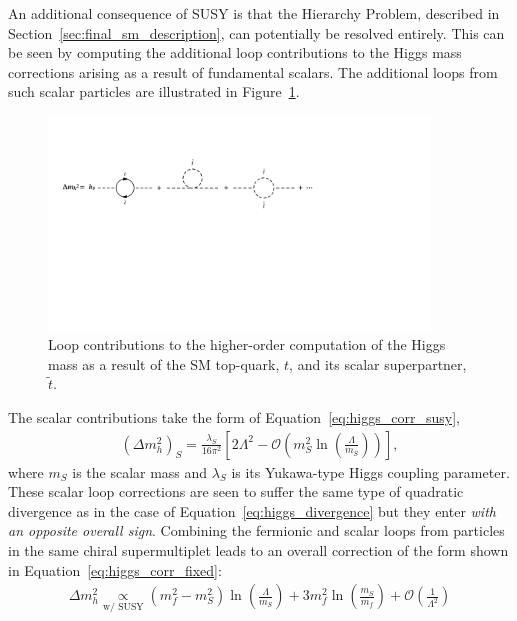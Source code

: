 An additional consequence of SUSY is that the Hierarchy Problem, described in Section~\ref{sec:final_sm_description},
can potentially be resolved entirely.
This can be seen by computing the additional loop contributions to the Higgs mass corrections arising as a result of fundamental scalars.
The additional loops from such scalar particles are illustrated in Figure~\ref{fig:higgs_mass_correction_stop}.
\begin{figure}[!htb]
    \begin{center}
        \includegraphics[width=0.9\textwidth]{figures/higgs_corr/higgs_mass_corrections_stopPDF}
        \caption{
            Loop contributions to the higher-order computation of the Higgs mass as a result of the SM top-quark, $t$,
            and its scalar superpartner, $\tilde{t}$.
        }
        \label{fig:higgs_mass_correction_stop}
    \end{center}
\end{figure}
The scalar contributions take the form of Equation~\ref{eq:higgs_corr_susy},
\begin{align}
    \left( \Delta m_h^2 \right)_{S} = \frac{\lambda_S}{16 \pi^2} \left[ 2 \Lambda^2 - \mathcal{O} \left( m_S^2 \ln \left( \frac{\Lambda}{m_S} \right) \right) \right],
    \label{eq:higgs_corr_susy}
\end{align}
where $m_S$ is the scalar mass and $\lambda_S$ is its Yukawa-type Higgs coupling parameter.
These scalar loop corrections are seen to suffer the same type of quadratic divergence
as in the case of Equation~\ref{eq:higgs_divergence} but they enter \textit{with an opposite overall sign}.
Combining the fermionic and scalar loops from particles in the same chiral supermultiplet leads
to an overall correction of the form shown in Equation~\ref{eq:higgs_corr_fixed}:
\begin{align}
    \Delta m_h^2 \underset{\text{w/ SUSY}}{\propto} \left( m_f^2 - m_S^2 \right) \ln \left( \frac{\Lambda}{m_S} \right) + 3 m_f^2 \ln \left( \frac{m_S}{m_f} \right) + \mathcal{O} \left( \frac{1}{\Lambda^2} \right)
    \label{eq:higgs_corr_fixed}
\end{align}
